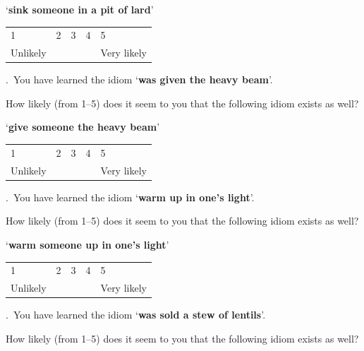 \documentclass[output=paper]{langsci/langscibook}
\begin{document}
\begin{paperappendix}
{\noindent \enquote*{\textbf{sink someone in a pit of lard}}\vspace{.5\baselineskip}

\noindent \begin{tabularx}{\textwidth}{XXXXX}
        1 & 2 & 3 & 4 & 5\\
        Unlikely & & & & Very likely\\
        \end{tabularx}\vspace{1\baselineskip}

.\ You have learned the idiom \enquote*{\textbf{was given the heavy beam}}.

\noindent How likely (from 1--5) does it seem to you that the following idiom exists
    as well?\vspace{.5\baselineskip}

\noindent \enquote*{\textbf{give someone the heavy beam}}\vspace{.5\baselineskip}

\noindent \begin{tabularx}{\textwidth}{XXXXX}
        1 & 2 & 3 & 4 & 5\\
        Unlikely & & & & Very likely\\
        \end{tabularx}\vspace{1\baselineskip}

.\ You have learned the idiom \enquote*{\textbf{warm up in one's light}}.

\noindent How likely (from 1--5) does it seem to you that the following idiom exists
    as well?\vspace{.5\baselineskip}

\noindent \enquote*{\textbf{warm someone up in one's light}}\vspace{.5\baselineskip}

\noindent \begin{tabularx}{\textwidth}{XXXXX}
        1 & 2 & 3 & 4 & 5\\
        Unlikely & & & & Very likely\\
        \end{tabularx}\vspace{1\baselineskip}

\newpage

.\ You have learned the idiom \enquote*{\textbf{was sold a stew of lentils}}.

\noindent How likely (from 1--5) does it seem to you that the following idiom exists
    as well?\vspace{.5\baselineskip}

}
\end{paperappendix}
\end{document}
